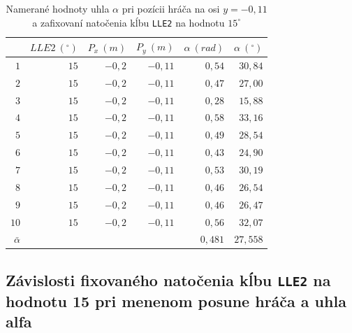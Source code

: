 \begin{table}[H]
	\begin{tabular}{||r||r|r|r||r|r||}
	\hline
	\hline
	& $LLE2~(^{\circ})$ & $P_x~(m)$ & $P_y~(m)$ &  $\alpha~(rad)$ & $\alpha~(^{\circ})$ \\
	\hline
	\hline
	$1$ & $15$ & $-0,2$ & $-0,11$ & $0,54$ & $30,84$ \\ 
	\hline
	$2$ & $15$ & $-0,2$ & $-0,11$ & $0,47$ & $27,00$ \\ 
	\hline
	$3$ & $15$ & $-0,2$ & $-0,11$ & $0,28$ & $15,88$ \\ 
	\hline
	$4$ & $15$ & $-0,2$ & $-0,11$ & $0,58$ & $33,16$ \\ 
	\hline
	$5$ & $15$ & $-0,2$ & $-0,11$ & $0,49$ & $28,54$ \\ 
	\hline
	$6$ & $15$ & $-0,2$ & $-0,11$ & $0,43$ & $24,90$ \\ 
	\hline
	$7$ & $15$ & $-0,2$ & $-0,11$ & $0,53$ & $30,19$ \\ 
	\hline
	$8$ & $15$ & $-0,2$ & $-0,11$ & $0,46$ & $26,54$ \\ 
	\hline
	$9$ & $15$ & $-0,2$ & $-0,11$ & $0,46$ & $26,47$ \\ 
	\hline
	$10$ & $15$ & $-0,2$ & $-0,11$ & $0,56$ & $32,07$ \\ 
	\hline
	\hline
	$\bar{\alpha}$ & & & & $0,481$ & $27,558$ \\
	\hline
	\hline
	\end{tabular}
	\centering
	\caption{Namerané hodnoty uhla $\alpha$ pri pozícii hráča na osi $y=-0,11$ a zafixovaní natočenia kĺbu \texttt{LLE2} na hodnotu $15^{\circ}$}
	\label{tab_max_lle2_biliard_15}
\end{table}

\subsection{Závislosti fixovaného natočenia kĺbu \texttt{LLE2} na hodnotu 15 pri menenom posune hráča a uhla alfa} \label{sec_fix_15_shift}

